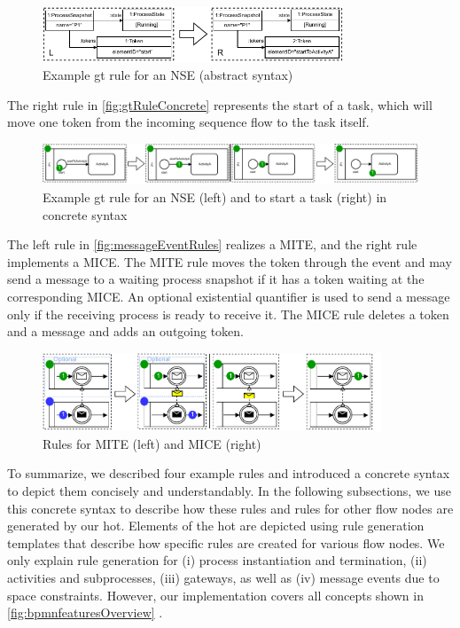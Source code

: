 \documentclass[runningheads]{llncs}
\begin{document}
\begin{figure}[ht]
    \centering
  \includegraphics[width=0.8\textwidth]{images/rule_abstract.pdf}
  \caption{Example \gls*{gt} rule for an NSE (abstract syntax)}  \label{fig:gtRuleAbstract}
\end{figure}

The right rule in \autoref{fig:gtRuleConcrete} represents the start of a task, which will move one token from the incoming sequence flow to the task itself.

\begin{figure}[ht]
    \centering
  \includegraphics[width=1\textwidth]{images/rule_concrete.pdf}
  \caption{Example \gls*{gt} rule for an NSE (left) and to start a task (right) in concrete syntax}
  \label{fig:gtRuleConcrete}
\end{figure}

The left rule in \autoref{fig:messageEventRules} realizes a MITE, and the right rule implements a MICE.
The MITE rule moves the token through the event and may send a message to a waiting process snapshot if it has a token waiting at the corresponding MICE.
An optional existential quantifier \cite{rensinkNestedQuantificationGraph2006} is used to send a message only if the receiving process is ready to receive it.
The MICE rule deletes a token and a message and adds an outgoing token.

\begin{figure}[ht]
    \centering
    \includegraphics[width=0.9\textwidth]{images/bpmn_semantics-message-events.pdf}
    \caption{Rules for MITE (left) and MICE (right)}
    \label{fig:messageEventRules}
\end{figure}

To summarize, we described four example rules and introduced a concrete syntax to depict them concisely and understandably.
In the following subsections, we use this concrete syntax to describe how these rules and rules for other flow nodes are generated by our \gls*{hot}.
Elements of the \gls*{hot} are depicted using rule generation templates that describe how specific rules are created for various flow nodes.
We only explain rule generation for (i) process instantiation and termination, (ii) activities and subprocesses, (iii) gateways, as well as (iv) message events due to space constraints.
However, our implementation covers all concepts shown in \autoref{fig:bpmnfeaturesOverview} \cite{krauterArtifactsICGT2023}.
\end{document}
